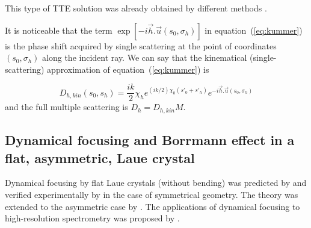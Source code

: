 \documentclass[preprint]{iucr}              %
\newcommand{\inred}[1]{{\color{red}#1}}
\begin{document}
This \inred{type of TTE solution} was already obtained by different methods \cite{Petrashen1974,Katagawa1974,Litzmann1974,Chukhovski1977}.

\inred{
It is noticeable that the term $\exp[-i\vec h . \vec u (s_0,\sigma_h)]$ in equation~(\ref{eq:kummer}) is the phase shift acquired by single scattering at the point of coordinates $(s_0,\sigma_h)$ along the incident ray. We can say that the kinematical (single-scattering) approximation of equation~(\ref{eq:kummer}) is 

\begin{equation}
\label{eq:kummerapprox}
    D_{h,kin}(s_0,s_h) = \frac{i k }{2} \chi_h e^{(ik/2) \chi_0 (s'_0 + s'_h)} e^{-i \vec h . \vec u (s_0,\sigma_h)} 
\end{equation}
and the full multiple scattering is $D_h=D_{h,kin} M$.
}

          
\subsection{Dynamical focusing and Borrmann effect in a flat\inred{, asymmetric, Laue} crystal}
\label{sec:LaueFlat}



Dynamical focusing \inred{by} flat Laue crystals (without bending) \inred{was predicted by}  and verified experimentally by \cite{Aristov1978,Aristov1980PhysStatSol,Aristov1980}
in the case of symmetrical geometry. The theory was extended to the asymmetric case by . \inred{The applications of dynamical focusing to high-resolution spectrometry was proposed by \citeasnoun{KohnGorobtsov2013}.}
\end{document}
